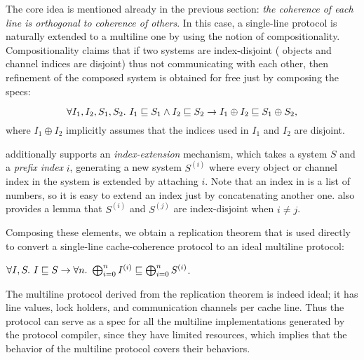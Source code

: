 The core idea is mentioned already in the previous section: \emph{the coherence of each line is orthogonal to coherence of others}.
In this case, a single-line \hemiola{} protocol is naturally extended to a multiline one by using the notion of compositionality.
Compositionality claims that if two systems are index-disjoint (\ie{} objects and channel indices are disjoint) thus not communicating with each other, then refinement of the composed system is obtained for free just by composing the specs:
\begin{theorem}[Compositionality]
  \begin{displaymath}
    \forall I_1, I_2, S_1, S_2.\ \refines{I_1}{S_1} \land \refines{I_2}{S_2} \to
    \refines{I_1 \oplus I_2}{S_1 \oplus S_2},
  \end{displaymath}
  where $I_1 \oplus I_2$ implicitly assumes that the indices used in $I_1$ and $I_2$ are disjoint.
\end{theorem}

\hemiola{} additionally supports an \emph{index-extension} mechanism, which takes a system $S$ and a \emph{prefix index} $i$, generating a new system $S^{(i)}$ where every object or channel index in the system is extended by attaching $i$.
Note that an index in \hemiola{} is a list of numbers, so it is easy to extend an index just by concatenating another one.
\hemiola{} also provides a lemma that $S^{(i)}$ and $S^{(j)}$ are index-disjoint when $i \neq j$.

Composing these elements, we obtain a replication theorem that is used directly to convert a single-line cache-coherence protocol to an ideal multiline protocol:
\begin{theorem}[Replication]
  $\forall I, S.\ I \sqsubseteq S \to \forall n.\ \bigoplus^{n}_{i=0} I^{(i)} \sqsubseteq \bigoplus^{n}_{i=0} S^{(i)}$.
  \label{thm-replication}
\end{theorem}

The multiline protocol derived from the replication theorem is indeed ideal; it has line values, lock holders, and communication channels per cache line.
Thus the protocol can serve as a spec for all the multiline implementations generated by the protocol compiler, since they have limited resources, which implies that the behavior of the multiline protocol covers their behaviors.


